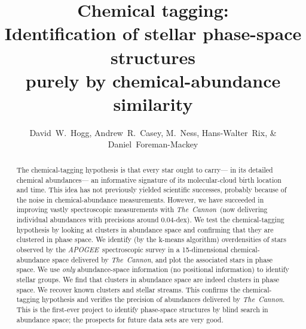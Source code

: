 \documentclass[12pt, letterpaper, preprint]{aastex}
\newcommand{\acronym}[1]{{\small{#1}}}
\newcommand{\project}[1]{\textsl{#1}}
\newcommand{\apogee}{\acronym{\project{APOGEE}}}
\newcommand{\thecannon}{\project{The~Cannon}}
\begin{document}
\title{Chemical tagging: \\
       Identification of stellar phase-space structures \\
       purely by chemical-abundance similarity}
\author{David~W.~Hogg,
        Andrew~R.~Casey,
        M.~Ness,
        Hans-Walter~Rix, \&
        Daniel~Foreman-Mackey}

\begin{abstract}
The chemical-tagging hypothesis is that every star ought to carry---%
in its detailed chemical abundances---%
an informative signature of its molecular-cloud birth location and time.
This idea has not previously yielded scientific successes, probably because of the
noise in chemical-abundance measurements.
However, we have succeeded in improving vastly spectroscopic measurements with \thecannon\ 
(now delivering individual abundances with precisions around 0.04-dex).
We test the chemical-tagging hypothesis by looking at clusters in abundance space
and confirming that they are clustered in phase space.
We identify (by the k-means algorithm) overdensities of stars observed by the \apogee\ spectroscopic survey
in a 15-dimensional chemical-abundance space delivered by \thecannon,
and plot the associated stars in phase space.
We use \emph{only} abundance-space information (no positional information) to identify stellar groups.
We find that clusters in abundance space are indeed clusters in phase space.
We recover known clusters and stellar streams.
This confirms the chemical-tagging hypothesis and verifies the precision of abundances delivered by \thecannon.
This is the first-ever project to identify phase-space structures by blind search in abundance space;
the prospects for future data sets are very good.
\end{abstract}

\end{document}
